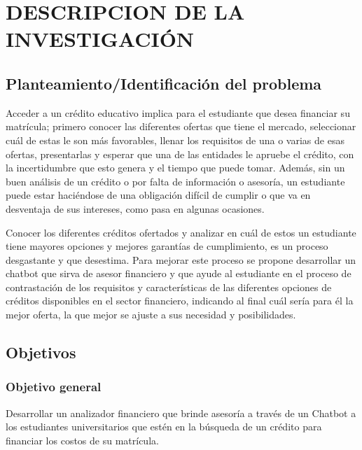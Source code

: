 \chapter{DESCRIPCION DE LA INVESTIGACIÓN}
\section{Planteamiento/Identificación del problema}
Acceder a un crédito educativo implica para el estudiante que desea financiar su matrícula; primero conocer las diferentes ofertas que tiene el mercado, seleccionar cuál de estas le son más favorables, llenar los requisitos de una o varias de esas ofertas, presentarlas y esperar que una de las entidades le apruebe el crédito, con la incertidumbre que esto genera y el tiempo que puede tomar. Además, sin un buen análisis de un crédito o por falta de información o asesoría, un estudiante puede estar haciéndose de una obligación difícil de cumplir o que va en desventaja de sus intereses, como pasa en algunas ocasiones. 

Conocer los diferentes créditos ofertados y analizar en cuál de estos un estudiante tiene mayores opciones y mejores garantías de cumplimiento, es un proceso desgastante y que desestima. Para mejorar este proceso se propone desarrollar un chatbot que sirva de asesor financiero y que ayude al estudiante en el proceso de contrastación de los requisitos y características de las diferentes opciones de créditos disponibles en el sector financiero, indicando al final cuál sería para él la mejor oferta, la que mejor se ajuste a sus necesidad y posibilidades.
\newpage

\section{Objetivos}
\subsection{Objetivo general}
Desarrollar un analizador financiero que brinde asesoría a través de un Chatbot a los estudiantes universitarios que estén en la búsqueda de un crédito para financiar los costos de su matrícula.

